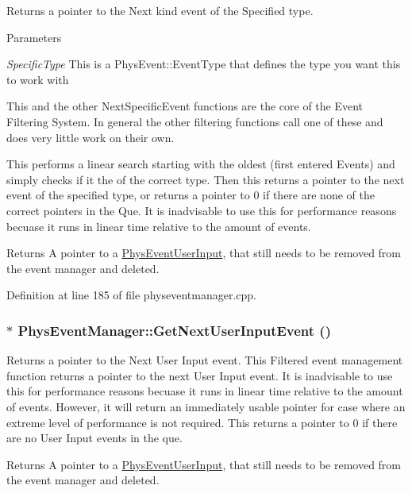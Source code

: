 Returns a pointer to the Next kind event of the Specified type. 
\begin{DoxyParams}{Parameters}
\item[{\em SpecificType}]This is a PhysEvent::EventType that defines the type you want this to work with\end{DoxyParams}
This and the other NextSpecificEvent functions are the core of the Event Filtering System. In general the other filtering functions call one of these and does very little work on their own. \par
 This performs a linear search starting with the oldest (first entered Events) and simply checks if it the of the correct type. Then this returns a pointer to the next event of the specified type, or returns a pointer to 0 if there are none of the correct pointers in the Que. It is inadvisable to use this for performance reasons becuase it runs in linear time relative to the amount of events. \begin{DoxyReturn}{Returns}
A pointer to a \hyperlink{classPhysEventUserInput}{PhysEventUserInput}, that still needs to be removed from the event manager and deleted. 
\end{DoxyReturn}


Definition at line 185 of file physeventmanager.cpp.\hypertarget{classPhysEventManager_a4874a9b1138d2351bf28e527a66c02b8}{
\subsubsection[{GetNextUserInputEvent}]{ $\ast$ PhysEventManager::GetNextUserInputEvent ()}}
\label{d5/dd7/classPhysEventManager_a4874a9b1138d2351bf28e527a66c02b8}


Returns a pointer to the Next User Input event. This Filtered event management function returns a pointer to the next User Input event. It is inadvisable to use this for performance reasons becuase it runs in linear time relative to the amount of events. However, it will return an immediately usable pointer for case where an extreme level of performance is not required. This returns a pointer to 0 if there are no User Input events in the que. \begin{DoxyReturn}{Returns}
A pointer to a \hyperlink{classPhysEventUserInput}{PhysEventUserInput}, that still needs to be removed from the event manager and deleted. 
\end{DoxyReturn}


